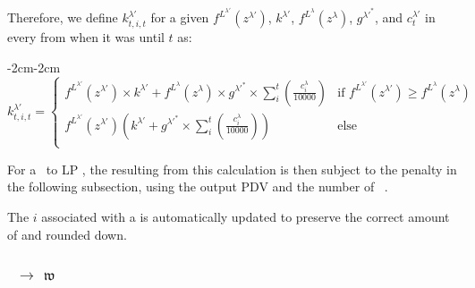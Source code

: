 \documentclass[class=article, crop=false]{standalone}
\begin{document}
\begin{enumerate}
    Therefore, we define $k_{t,i,t}^{\lambda'}$ for a given $f^{L^{\lambda'}}(z^{\lambda'})$, $k^{\lambda'}$, $f^{L^{\lambda}}(z^{\lambda})$, $g^{\lambda'^{*}}$, and $c_{t}^{\lambda'}$ in every  from when it was  until $t$ as:

        \begin{adjustwidth}{-2cm}{-2cm}
        $$
            k_{t,i,t}^{\lambda'} = 
                \begin{cases}
                    f^{L^{\lambda'}}(z^{\lambda'}) 
                    \times 
                    k^{\lambda'} +
                    f^{L^{\lambda}}(z^{\lambda})
                    \times g^{\lambda'^{*}} \times
                    \sum\limits_{i}^{t} 
                    \left
                        (\frac{c_{i}^{\lambda}}{10000}
                    \right) 
                        & \text{if } f^{L^{\lambda'}}(z^{\lambda'}) \geq f^{L^{\lambda}}(z^{\lambda}) \\
                    
                    f^{L^{\lambda'}}(z^{\lambda'}) 
                    \left( 
                        k^{\lambda'} + 
                        g^{\lambda'^{*}} \times
                        \sum\limits_{i}^{t} 
                        \left
                            (\frac{c_{i}^{\lambda}}{10000}
                        \right) 
                    \right)
                        & \text{else}\\
                \end{cases}
        $$
        \end{adjustwidth}

    For a \Pinto\ to  LP , the  resulting from this calculation is then subject to the penalty in the following subsection, using the output PDV and the number of \Pinto\ .

    The $i$ associated with a   is automatically updated to preserve the correct amount of  and rounded down.
    
\end{enumerate}


\begingroup
{}
\setlength{\abovedisplayskip}{6pt}
\setlength{\belowdisplayskip}{6pt}

\subsubsection{\Pinto\ $\rightarrow$ $\mathfrak{w}$}
\end{document}
